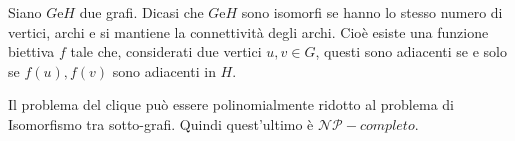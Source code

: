 \documentclass{subfiles}
\begin{document}
\begin{Definition*}
    Siano \(G \text{e} H\) due grafi. Dicasi che \(G \text{e} H\) sono isomorfi se hanno lo stesso numero di vertici, archi e si mantiene la connettività degli archi.
    Cioè esiste una funzione biettiva \(f\) tale che, considerati due vertici \(u, v \in G\), questi sono adiacenti se e solo se \(f(u), f(v)\) sono adiacenti in \(H\).
\end{Definition*}

\begin{Theorem}
    Il problema del clique può essere polinomialmente ridotto al problema di Isomorfismo tra sotto-grafi. Quindi quest'ultimo è \(\mathcal{NP}-completo\).
\end{Theorem}
\end{document}
